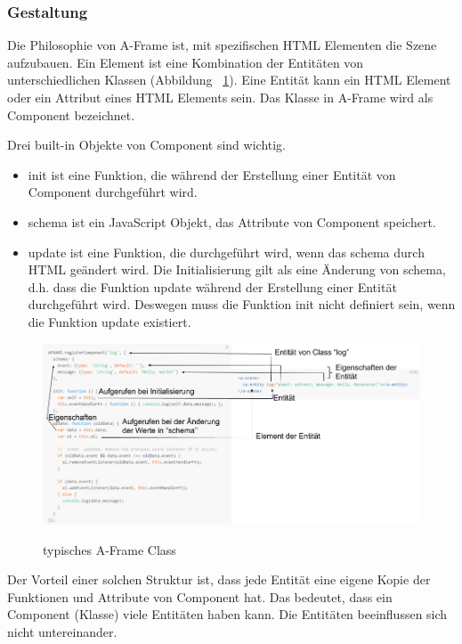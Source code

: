  \subsubsection{Gestaltung}
 Die Philosophie von A-Frame ist, mit spezifischen HTML Elementen die Szene aufzubauen. Ein Element ist eine Kombination der Entitäten von unterschiedlichen Klassen (Abbildung ~\ref{fig:aframeClass}). Eine Entität kann ein HTML Element oder ein Attribut eines HTML Elements sein. Das Klasse in A-Frame wird als Component bezeichnet.
 
 Drei built-in Objekte von Component sind wichtig.
 \begin{itemize}
     \item {\selectfont init} ist eine Funktion, die während der Erstellung einer Entität von Component durchgeführt wird.
     \item {\selectfont schema} ist ein JavaScript Objekt, das Attribute von Component speichert.
     \item {\selectfont update} ist eine Funktion, die durchgeführt wird, wenn das schema durch HTML geändert wird. Die Initialisierung gilt als eine Änderung von schema, d.h. dass die Funktion update während der Erstellung einer Entität durchgeführt wird. Deswegen muss die Funktion init nicht definiert sein, wenn die Funktion update existiert.
 \end{itemize}
 
\begin{figure}[ht]
\vspace*{1em}
\centering
\caption[Typisches A-Frame Class]{typisches A-Frame Class}
\includegraphics[width=\textwidth]{images/aframeClass.png}
\label{fig:aframeClass} 
\end{figure}
 
 Der Vorteil einer solchen Struktur ist, dass jede Entität eine eigene Kopie der Funktionen und Attribute von Component hat. Das bedeutet, dass ein Component (Klasse) viele Entitäten haben kann. Die Entitäten beeinflussen sich nicht untereinander.
 
